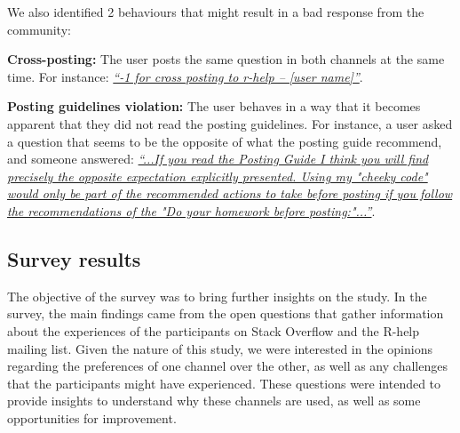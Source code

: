 \documentclass{sig-alternate-05-2015}
\begin{document}
	We also identified 2 behaviours that might result in a bad response from the community:
	\begin{packed_enum}
		\item \textbf{Cross-posting:} The user posts the same question in both channels at the same time.
		For instance: \textit{\href{http://goo.gl/ENKrVK}{``-1 for cross posting to r-help – [user name]''}}.
		\item \textbf{Posting guidelines violation:} The user behaves in a way that it becomes apparent that they did not read the posting guidelines.
		For instance, a user asked a question that seems to be the opposite of what the posting guide recommend, and someone answered: \textit{\href{http://goo.gl/FUm1HC}{``...If you read the Posting Guide I think you will find precisely the opposite expectation explicitly presented. Using my "cheeky code" would only be part of the recommended actions to take before posting if you follow the recommendations of the "Do your homework before posting:"...''}}.
	\end{packed_enum}

\subsection{Survey results}
\label{sec:survey}

The objective of the survey was to bring further insights on the study.
In the survey, the main findings came from the open questions that gather information about the experiences of the participants on Stack Overflow and the R-help mailing list.
Given the nature of this study, we were interested in the opinions regarding the preferences of one channel over the other, as well as any challenges that the participants might have experienced.
These questions were intended to provide insights to understand why these channels are used, as well as some opportunities for improvement.

\end{document}
